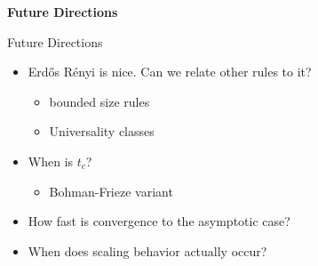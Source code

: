 \documentclass{beamer}
\newcommand{\ER}{Erd\H{o}s R\'enyi\xspace}
\begin{document}
{
\begin{frame}
        \bfseries
        {\color{white}
                \huge Future Directions
        }
\end{frame}
}

\begin{frame}{Future Directions}
	\begin{itemize}
		\item \ER is nice. Can we relate other rules to it?
			\begin{itemize}
				\item bounded size rules
				\item Universality classes
			\end{itemize}
		\item When is $t_c$?
			\begin{itemize}
				\item Bohman-Frieze variant
			\end{itemize}
		\item How fast is convergence to the asymptotic case?
		\item When does scaling behavior actually occur?
	\end{itemize}
\end{frame}
\end{document}
